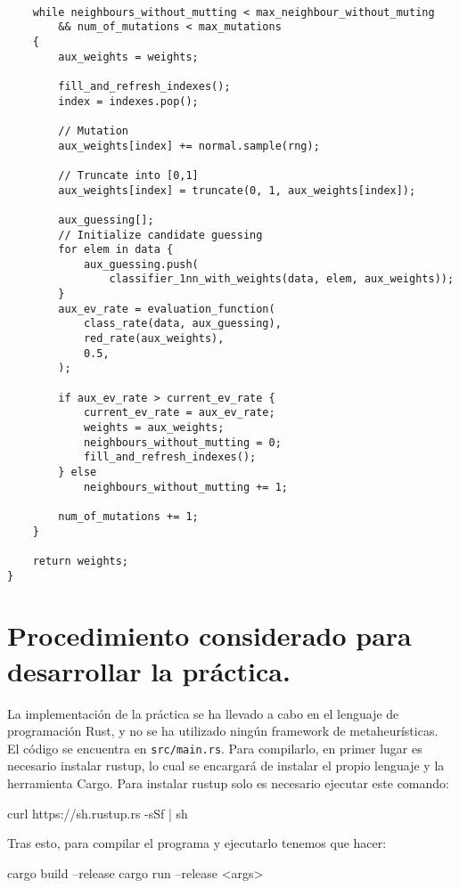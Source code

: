 \documentclass[size=a4, parskip=half, titlepage=false, toc=flat, toc=bib, 12pt]{scrartcl}
\begin{document}
\begin{verbatim}

    while neighbours_without_mutting < max_neighbour_without_muting
        && num_of_mutations < max_mutations
    {
        aux_weights = weights;

        fill_and_refresh_indexes();
        index = indexes.pop();

        // Mutation
        aux_weights[index] += normal.sample(rng);

        // Truncate into [0,1]
        aux_weights[index] = truncate(0, 1, aux_weights[index]);

        aux_guessing[];
        // Initialize candidate guessing
        for elem in data {
            aux_guessing.push(
                classifier_1nn_with_weights(data, elem, aux_weights));
        }
        aux_ev_rate = evaluation_function(
            class_rate(data, aux_guessing),
            red_rate(aux_weights),
            0.5,
        );

        if aux_ev_rate > current_ev_rate {
            current_ev_rate = aux_ev_rate;
            weights = aux_weights;
            neighbours_without_mutting = 0;
            fill_and_refresh_indexes();
        } else
            neighbours_without_mutting += 1;

        num_of_mutations += 1;
    }

    return weights;
}

\end{verbatim}

\newpage
\section{Procedimiento considerado para desarrollar la práctica.}
La implementación de la práctica se ha llevado a cabo en el lenguaje de programación Rust, y no se ha utilizado ningún framework de metaheurísticas.\\

El código se encuentra en \texttt{src/main.rs}. Para compilarlo, en primer lugar es necesario instalar rustup, lo cual se encargará de instalar el propio lenguaje y la herramienta Cargo. Para instalar rustup solo es necesario ejecutar este comando:
\begin{shell}
curl https://sh.rustup.rs -sSf | sh
\end{shell}

Tras esto, para compilar el programa y ejecutarlo tenemos que hacer:
\begin{shell}
cargo build --release
cargo run --release <args>
\end{shell}
\end{document}
